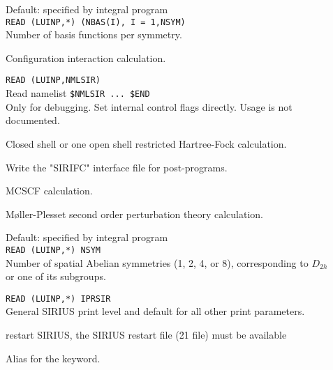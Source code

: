 \begin{description}
\item[]
   Default: specified by integral program \\
   \verb"READ (LUINP,*) (NBAS(I), I = 1,NSYM)" \\
   Number of basis functions per symmetry.

\item[]
  Configuration interaction calculation.
 
\item[]
  \verb"READ (LUINP,NMLSIR)" \\
  Read namelist \verb"$NMLSIR ... $END" \\
  Only for debugging. Set internal control flags directly.
  Usage is not documented.

\item[]
  Closed shell or one open shell restricted
  Hartree-Fock calculation. 
 
\item[]
  Write the "SIRIFC" interface file for post-programs.
 
\item[]
  MCSCF calculation.
 
\item[]
  M{\o}ller-Plesset second order perturbation theory calculation. 
 
\item[]
  Default: specified by integral program \\
  \verb"READ (LUINP,*) NSYM" \\
  Number of spatial Abelian symmetries (1, 2, 4, or 8), corresponding
  to $D_{2h}$ or one of its subgroups.
 
 
\item[]
  \verb"READ (LUINP,*) IPRSIR" \\
  General SIRIUS print level and default for all other print parameters.
 
\item[]
  restart SIRIUS,
  the SIRIUS restart file (\f{21} file) must be available
 
\item[]
	Alias for the  keyword.


\end{description}
